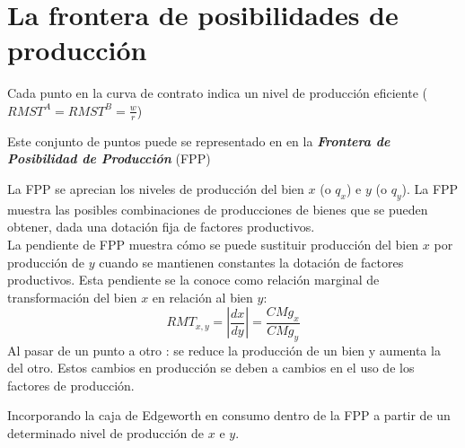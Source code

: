 \section[FPP]{La frontera de posibilidades de producción}

\begin{frame}
	Cada punto en la curva de contrato indica un nivel de producción eficiente ($RMST^A = RMST^B = \frac{w}{r}$)
		\begin{center}
			\hspace{0.5cm} 
		\end{center}
\end{frame}
\begin{frame}
	Este conjunto de puntos puede se representado en en la \emph{\textbf{Frontera de Posibilidad de Producción}} (FPP)
		\begin{center}
			
		\end{center}
\end{frame}
\begin{frame}
	La FPP se aprecian los niveles de producción del bien $x$ (o $q_x$) e $y$ (o $q_y$). La FPP muestra las posibles combinaciones de producciones de bienes que se pueden obtener, dada una dotación fija de factores productivos.\\
		\bigskip
	La pendiente de FPP muestra cómo se puede sustituir producción del bien $x$ por producción de $y$ cuando se mantienen constantes la dotación de factores productivos. Esta pendiente se la conoce como relación marginal de transformación del bien $x$ en relación al bien $y$:
		$$RMT_{x,y} = \left| \frac{dx}{dy}\right|= \frac{CMg_x}{CMg_y}$$
	Al pasar de un punto a otro : se reduce la producción de un bien y aumenta la del otro. Estos cambios en producción se deben a cambios en el uso de los factores de producción.
\end{frame}
\begin{frame}
	Incorporando la caja de Edgeworth en consumo dentro de la FPP a partir de un determinado nivel de producción de $x$ e $y$.
		\begin{center}
			\hspace{0.5cm} 
		\end{center}
\end{frame}
